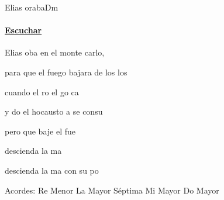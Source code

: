 \documentclass[12pt, spanish]{book}
\begin{document}
    \begin{song}{Elias oraba}{Dm}
    {} %
    {}
    {} %
    {}
        \ifChordBk
        \paragraph{\mbox{}\hfill\protect\href{https://open.spotify.com/intl-es/track/3pbftGNjzZIe3ztSa3poPU}{Escuchar}\mbox{}\hfill}
        \fi

        \begin{SBOpGroup}
            Elias oba en el monte carlo,

            para que el fuego bajara de los los
        \end{SBOpGroup}

        \begin{SBOpGroup}
             cuando el ro el go ca

            y do el hocausto a se consu
        \end{SBOpGroup}

        \begin{SBChorus}
            pero que baje el fue

            descienda la ma

            descienda la ma con su po
        \end{SBChorus}

        \ifChordBk
        \begin{SBOpGroup}
            Acordes:\break
            \upchord{\Dm}\qquad Re Menor \hfill
            \upchord{\Aseven}\qquad La Mayor S\'eptima \hfill\null\break
            \upchord{\E}\qquad Mi Mayor \hfill
            \upchord{\C}\qquad Do Mayor \hfill\null\break
        \end{SBOpGroup}
        \fi
    \end{song}
\end{document}

